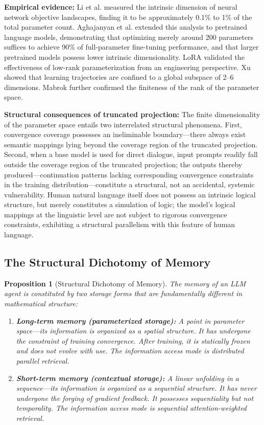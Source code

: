 \documentclass[11pt,a4paper]{article}
\newtheorem{proposition}[theorem]{Proposition}
\theoremstyle{definition}
\begin{document}
\textbf{Empirical evidence:} Li et al.\cite{li2018intrinsic} measured the intrinsic dimension of neural network objective landscapes, finding it to be approximately 0.1\% to 1\% of the total parameter count. Aghajanyan et al.\cite{aghajanyan2020intrinsic} extended this analysis to pretrained language models, demonstrating that optimizing merely around 200 parameters suffices to achieve 90\% of full-parameter fine-tuning performance, and that larger pretrained models possess lower intrinsic dimensionality. LoRA\cite{hu2021lora} validated the effectiveness of low-rank parameterization from an engineering perspective. Xu\cite{xu2026parameter} showed that learning trajectories are confined to a global subspace of 2--6 dimensions. Mabrok\cite{mabrok2026rank} further confirmed the finiteness of the rank of the parameter space.

\textbf{Structural consequences of truncated projection:} The finite dimensionality of the parameter space entails two interrelated structural phenomena. First, convergence coverage possesses an ineliminable boundary---there always exist semantic mappings lying beyond the coverage region of the truncated projection. Second, when a base model is used for direct dialogue, input prompts readily fall outside the coverage region of the truncated projection; the outputs thereby produced---continuation patterns lacking corresponding convergence constraints in the training distribution---constitute a structural, not an accidental, systemic vulnerability. Human natural language itself does not possess an intrinsic logical structure, but merely constitutes a simulation of logic; the model's logical mappings at the linguistic level are not subject to rigorous convergence constraints, exhibiting a structural parallelism with this feature of human language.

\subsection{The Structural Dichotomy of Memory}

\begin{proposition}[Structural Dichotomy of Memory]
The memory of an LLM agent is constituted by two storage forms that are fundamentally different in mathematical structure:
\begin{enumerate}[leftmargin=*,itemsep=0.3em]
    \item \textbf{Long-term memory (parameterized storage):} A point in parameter space---its information is organized as a spatial structure. It has undergone the constraint of training convergence. After training, it is statically frozen and does not evolve with use. The information access mode is distributed parallel retrieval.
    \item \textbf{Short-term memory (contextual storage):} A linear unfolding in a sequence---its information is organized as a sequential structure. It has never undergone the forging of gradient feedback. It possesses sequentiality but not temporality. The information access mode is sequential attention-weighted retrieval.
\end{enumerate}
\end{proposition}
\end{document}
